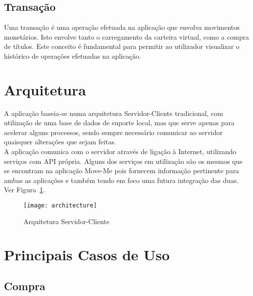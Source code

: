 \subsection{Transação}
Uma transação é uma operação efetuada na aplicação que envolva movimentos monetários. Isto envolve tanto o carregamento da carteira virtual, como a compra de títulos. Este conceito é fundamental para permitir ao utilizador visualizar o histórico de operações efetuadas na aplicação.

\section{Arquitetura}

A aplicação baseia-se numa arquitetura Servidor-Cliente tradicional, com utilização de uma base de dados de suporte local, mas que serve apenas para acelerar alguns processos, sendo sempre necessário comunicar ao servidor quaisquer alterações que sejam feitas.
\\A aplicação comunica com o servidor através de ligação à Internet, utilizando serviços \web com API própria. Alguns dos serviços em utilização são os mesmos que se encontram na aplicação Move-Me pois fornecem informação pertinente para ambas as aplicações e também tendo em foco uma futura integração das duas. Ver Figura~\ref{fig:architecture}.

\begin{figure}[t]
  \begin{center}
    \leavevmode
    \texttt{[image: architecture]}
    \caption{Arquitetura Servidor-Cliente}
    \label{fig:architecture}
  \end{center}
\end{figure}

\section{Principais Casos de Uso}

\subsection{Compra}

